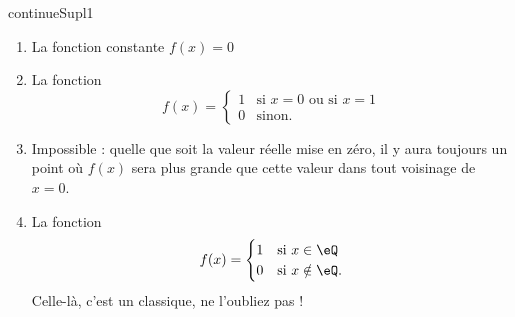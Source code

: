 
\begin{corrige}{continueSupl1}

\begin{enumerate}
\item La fonction constante $f(x)=0$
\item La fonction
\begin{equation}
	f(x)=\begin{cases}
	1	&	\text{si $x=0$ ou si $x=1$}\\
	0	&	 \text{sinon.}
\end{cases}
\end{equation}

\item Impossible :  quelle que soit la valeur réelle mise en zéro, il y aura toujours un point où $f(x)$ sera plus grande que cette valeur dans tout voisinage de $x=0$.
\item La fonction
\begin{equation}		\label{EqSupl1Dirich}
	f(x)=\begin{cases}
	1	&	\text{si $x\in\eQ$}\\
	0	&	 \text{si $x\notin\eQ$.}
\end{cases}
\end{equation}
Celle-là, c'est un classique, ne l'oubliez pas !

\end{enumerate}

\end{corrige}

